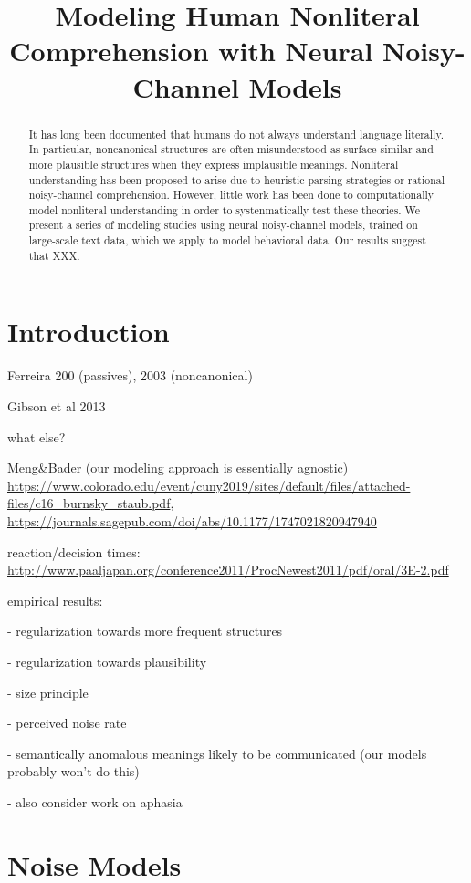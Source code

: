 \documentclass[11pt,a4paper]{article}
\title{Modeling Human Nonliteral Comprehension with Neural Noisy-Channel Models}
\begin{document}
\maketitle

\begin{abstract}
It has long been documented that humans do not always understand language literally.
In particular, noncanonical structures are often misunderstood as surface-similar and more plausible structures when they express implausible meanings.
Nonliteral understanding has been proposed to arise due to heuristic parsing strategies or rational noisy-channel comprehension.
However, little work has been done to computationally model nonliteral understanding in order to systenmatically test these theories.
We present a series of modeling studies using neural noisy-channel models, trained on large-scale text data, which we apply to model behavioral data.
Our results suggest that XXX.
\end{abstract}

\section{Introduction}

Ferreira 200 (passives), 2003 (noncanonical)

Gibson et al 2013

what else?

Meng\&Bader (our modeling approach is essentially agnostic)
\url{https://www.colorado.edu/event/cuny2019/sites/default/files/attached-files/c16_burnsky_staub.pdf}, \url{https://journals.sagepub.com/doi/abs/10.1177/1747021820947940}


reaction/decision times: \url{http://www.paaljapan.org/conference2011/ProcNewest2011/pdf/oral/3E-2.pdf}

empirical results:

- regularization towards more frequent structures

- regularization towards plausibility

- size principle

- perceived noise rate

- semantically anomalous meanings likely to be communicated (our models probably won't do this)

- also consider work on aphasia



\section{Noise Models}
\end{document}
